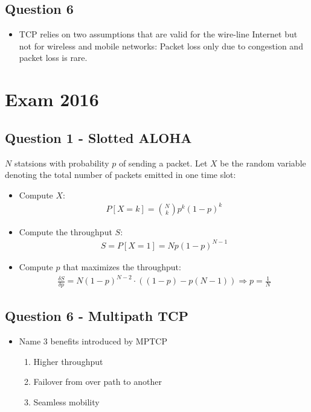\subsection*{Question 6}
\begin{itemize}
	\item TCP relies on two assumptions that are valid for the wire-line Internet but not for wireless and mobile networks: Packet loss only due to congestion and packet loss is rare.
\end{itemize}


\section*{Exam 2016}

\subsection*{Question 1 - Slotted ALOHA}
$N$ statsions with probability $p$ of sending a packet. Let $X$ be the random variable denoting the total number of packets emitted in one time slot:
\begin{itemize}
	\item Compute $X$:
	\begin{align*}
		P[X = k] = \binom{N}{k}p^k (1-p)^k
	\end{align*}
	\item Compute the throughput $S$:
	\begin{align*}
		S = P[X = 1] = N p (1-p)^{N-1}
	\end{align*}
	\item Compute $p$ that maximizes the throughput:
	\begin{align*}
		\frac{\delta S}{\delta p} = N (1-p)^{N-2} \cdot ((1-p) - p(N-1)) \Rightarrow p = \frac{1}{N}
	\end{align*}
\end{itemize}

\subsection*{Question 6 - Multipath TCP}
\begin{itemize}
	\item Name 3 benefits introduced by MPTCP
	\begin{enumerate}
		\item Higher throughput
		\item Failover from over path to another
		\item Seamless mobility
	\end{enumerate}
\end{itemize}

